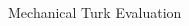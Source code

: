 \documentclass[final]{beamer}
\newcommand{\setblocksize}{\Large \centering}
\begin{document}
\begin{frame}{}
\begin{columns}[t]
\begin{column}{0.24\linewidth}
\begin{block}{\setblocksize Mechanical Turk Evaluation}
{}
\end{block}

\end{column}	%

\end{columns}

\end{frame}
\end{document}
